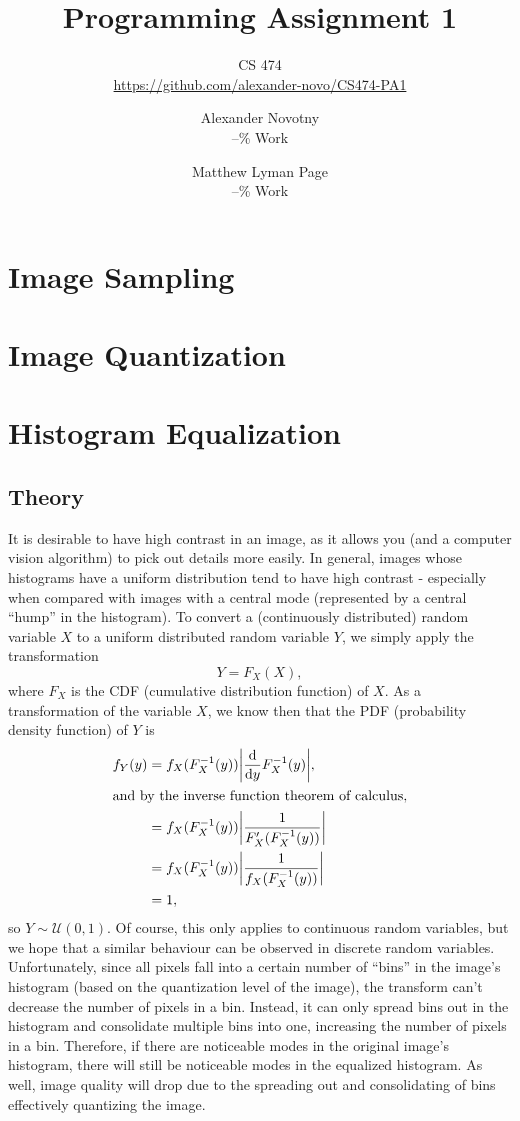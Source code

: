 \documentclass[headings=optiontoheadandtoc,listof=totoc,parskip=full]{scrartcl}
\title{Programming Assignment 1}
\subtitle{CS 474\\\url{https://github.com/alexander-novo/CS474-PA1}}
\author{Alexander Novotny\\--\% Work \and Matthew Lyman Page\\--\% Work}
\begin{document}
\maketitle
\tableofcontents

\newpage

\section{Image Sampling}

\section{Image Quantization}

\section{Histogram Equalization}

\subsection{Theory}
\label{sec:equalization-theory}
It is desirable to have high contrast in an image, as it allows you (and a computer vision algorithm) to pick out details more easily. In general, images whose histograms have a uniform distribution tend to have high contrast - especially when compared with images with a central mode (represented by a central ``hump'' in the histogram). To convert a (continuously distributed) random variable $X$ to a uniform distributed random variable $Y$, we simply apply the transformation \[
	Y = F_X(X),
\] where $F_X$ is the CDF (cumulative distribution function) of $X$. As a transformation of the variable $X$, we know then that the PDF (probability density function) of $Y$ is
\begin{align*}
	f_Y(y) &= f_X(F_X^{-1}(y)) \abs{\dv{y} F_X^{-1}(y)},\\
\intertext{and by the inverse function theorem of calculus,}
		&= f_X(F_X^{-1}(y)) \abs{\frac{1}{F_X'(F_X^{-1}(y))}}\\
		&= f_X(F_X^{-1}(y)) \abs{\frac{1}{f_X(F_X^{-1}(y))}}\\
		&= 1,
\end{align*}
so $Y \sim \mathcal U(0, 1)$. Of course, this only applies to continuous random variables, but we hope that a similar behaviour can be observed in discrete random variables. Unfortunately, since all pixels fall into a certain number of ``bins'' in the image's histogram (based on the quantization level of the image), the transform can't decrease the number of pixels in a bin. Instead, it can only spread bins out in the histogram and consolidate multiple bins into one, increasing the number of pixels in a bin. Therefore, if there are noticeable modes in the original image's histogram, there will still be noticeable modes in the equalized histogram. As well, image quality will drop due to the spreading out and consolidating of bins effectively quantizing the image. \par
\end{document}
